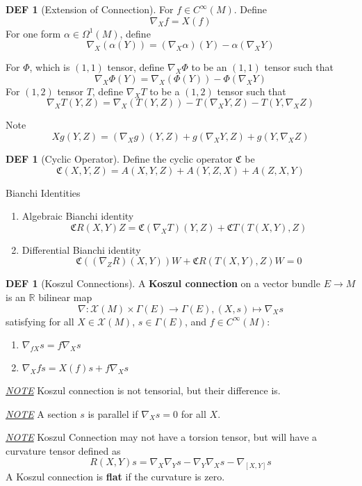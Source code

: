 \documentclass[twocolumn]{article}
\renewcommand{\emph}[1]{{\color{blue!70!black}\sffamily\bfseries #1}}
\newcommand{\X}{\mathscr{X}}
\newcommand{\n}{\nabla}
\newcommand{\R}{\mathbb{R}}
\newcommand{\C}{C^{\infty}}
\newcommand{\CY}{\mathfrak{C}}
\newcommand{\G}{\Gamma}
\newcommand{\N}{\textit{\underline{NOTE} }}
\newcommand{\W}{\Omega}
\theoremstyle{definition}
\newtheorem{defi}[thm]{DEF}
\begin{document}
\begin{defi}[Extension of Connection]
	For $f \in \C(M)$. Define 
	$$
		\n_X f = X(f)
	$$
	For one form $\alpha \in \W^1(M)$, define 
	$$
		\n_X(\alpha (Y)) = (\n_X \alpha)(Y) - \alpha(\n_X Y)
	$$

	For $\Phi$, which is $(1,1)$ tensor, define $\n_X \Phi$ to be an $(1,1)$ tensor such that 
	$$
		\n_X \Phi(Y) = \n_X(\Phi(Y)) - \Phi(\n_X Y)
	$$
	For $(1,2)$ tensor $T$, define $\n_X T$ to be a $(1,2)$ tensor such that
	$$
		\n_X T(Y, Z) = \n_X(T(Y, Z)) - T(\n_X Y, Z) - T(Y, \n_X Z)
	$$

	Note 
	$$
		X g(Y, Z) = (\n_X g)(Y, Z) + g(\n_X Y, Z) + g(Y, \n_X Z)
	$$
\end{defi}

\begin{defi}[Cyclic Operator]
	Define the cyclic operator $\CY$ be 
	$$
		\CY(X, Y, Z) = A(X, Y, Z) + A(Y, Z, X) + A(Z, X, Y)
	$$
\end{defi}

\begin{fthm}{Bianchi Identities}{}
	\begin{enumerate}
		\item Algebraic Bianchi identity 
			$$
				\CY R(X, Y) Z = \CY(\n_X T)(Y, Z) + \CY T (T (X, Y),Z)
			$$
		\item Differential Bianchi identity 
			$$
				\CY((\n_Z R)(X, Y))W + \CY R(T(X, Y), Z)W = 0
			$$
	\end{enumerate}
\end{fthm}

\begin{defi}[Koszul Connections]
	A \emph{Koszul connection} on a vector bundle $E \rightarrow  M$ is an $\R$ bilinear map 
	$$
		\n: \X (M) \times \G(E) \to \G (E), (X,s) \mapsto \n_X s
	$$
	satisfying for all $X \in \X(M)$, $s \in \G(E)$, and $f \in \C(M)$: 
	\begin{enumerate}
		\item $\n_{fX} s = f \n_X s$
		\item $\n_{X} fs = X(f) s + f \n_X s$
	\end{enumerate}

\end{defi}

\N Koszul connection is not tensorial, but their difference is.

\N A section $s$ is parallel if $\n_X s = 0$ for all $X$.

\N Koszul Connection may not have a torsion tensor, but will have a curvature tensor defined as 
$$
	R(X, Y)s = \n_X \n_Y s - \n_Y \n_X s - \n_{[X, Y]} s
$$
A Koszul connection is \emph{flat} if the curvature is zero.
\end{document}
